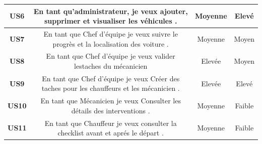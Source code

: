\begin{table}[htbp]
\begin{tabular}{|c|c|c|c|}
    \textbf{US6}  & \parbox{9cm}{\centering En tant qu'administrateur, je veux ajouter, supprimer et  visualiser les véhicules .}                                                        & Moyenne           & Elevé           \\
    \hline
    \textbf{US7}  & \parbox{9cm}{\centering En tant que Chef d'équipe je veux suivre le progrès et la localisation des voiture .}                                                        & Moyenne           & Moyen           \\
    \hline
    \textbf{US8}  & \parbox{9cm}{\centering En tant que Chef d’équipe je veux valider lestaches du mécanicien}                                                                           & Elevée            & Moyen           \\
    \hline
    \textbf{US9}  & \parbox{9cm}{\centering En tant que Chef d'équipe je veux Créer des taches pour les chauffeurs et les mécanicien .}                                                  & Elevée            & Elevé           \\
    \hline
    \textbf{US10} & \parbox{9cm}{\centering En tant que Mécanicien je veux Consulter les détails des interventions .}                                                                    & Moyenne           & Faible          \\
    \hline
    \textbf{US11} & \parbox{9cm}{\centering En tant que Chauffeur je veux consulter la checklist avant et aprés le départ . }                                                            & Moyenne           & Faible          \\
    \hline
  \end{tabular}
\end{table}







